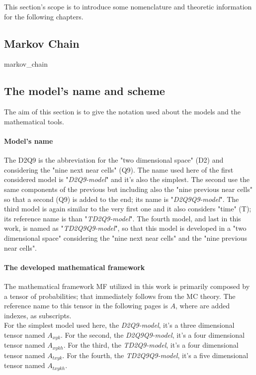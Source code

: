 \documentclass[class=article, crop=false]{standalone}
\begin{document}
This section's scope is to introduce some nomenclature and theoretic information for the following chapters.


\subsection{Markov Chain} %
	{markov_chain}
	

\FloatBarrier
\subsection{The model's name and scheme}
The aim of this section is to give the notation used about the models and the mathematical tools.


\paragraph{Model's name} 
The D2Q9 is the abbreviation for the "two dimensional space" (D2) and considering the "nine next near cells" (Q9).
The name used here of the first considered model is "\emph{D2Q9-model}" and it's also the simplest.
The second use the same components of the previous but including also the "nine previous near cells" so that a second (Q9) is added to the end; its name is "\emph{D2Q9Q9-model}".
The third model is again similar to the very first one and it also considers "time" (T); its reference name is than "\emph{TD2Q9-model}".
The fourth model, and last in this work, is named as "\emph{TD2Q9Q9-model}", so that this model is developed in a "two dimensional space" considering the "nine next near cells" and the "nine previous near cells".


\paragraph{The developed mathematical framework}
The mathematical framework MF utilized in this work is primarily composed by a tensor of probabilities; that immediately follows from the MC theory.
The reference name to this tensor in the following pages is $A$, where are added indexes, as subscripts.
\\For the simplest model used here, the \emph{D2Q9-model}, it's a three dimensional tensor named $A_{x y k}$.
For the second, the \emph{D2Q9Q9-model}, it's a four dimensional tensor named $A_{x y k h}$.
For the third, the \emph{TD2Q9-model}, it's a four dimensional tensor named $A_{t x y k}$.
For the fourth, the \emph{TD2Q9Q9-model}, it's a five dimensional tensor named $A_{t x y k h}$.
\end{document}
